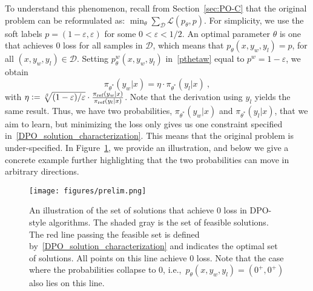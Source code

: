 To understand this phenomenon, recall from Section~\ref{sec:PO-C} that the original problem can be reformulated as: $\min_{\theta} \sum_{\mathcal{D}}{\mathcal L}(p_{\theta},p)$. 
For simplicity, we use the soft labels $p = (1 - \varepsilon , \varepsilon)$ for some $0 < \varepsilon < 1/2$. An optimal parameter $\theta$ is one that achieves $0$ loss for all samples in $\mathcal D$, which means that $p_{\theta}(x,y_w,y_l) = p$, for all $(x,y_w,y_l)\in\mathcal D$. Setting $p_{\theta}^w(x,y_w,y_l)$ in~\eqref{pthetaw} equal to $p^w=1-\varepsilon$, we obtain
%
\begin{equation} \label{DPO_solution_characterization}
    \pi_{\theta^{*}}(y_w | x) = \eta\cdot \pi_{\theta^{*}}(y_l | x)\ ,
\end{equation}
%
with $\eta \mathrel{\mathop:}= \sqrt[\beta]{(1 - \varepsilon)/\varepsilon}\cdot\frac{\pi_{\textrm{ref}}(y_w | x)}{\pi_{\textrm{ref}}(y_l | x)}$. Note that the derivation using $y_l$ yields the same result. Thus, we have two probabilities, $\pi_{\theta^{*}}(y_w | x)$ and $\pi_{\theta^{*}}(y_l | x)$, that we aim to learn, but minimizing the loss only gives us one constraint specified in~\eqref{DPO_solution_characterization}. This means that the original problem is under-specified. %
In Figure~\ref{fig:solution_set}, we provide an illustration, and below we give a concrete example further highlighting that the two probabilities can move in arbitrary directions.

\begin{figure}
    \centering
    \texttt{[image: figures/prelim.png]}
    \caption{An illustration of the set of solutions that achieve $0$ loss in DPO-style algorithms. The shaded gray is the set of feasible solutions. The red line passing the feasible set is defined by~\eqref{DPO_solution_characterization} and indicates the optimal set of solutions. All points on this line achieve $0$ loss. Note that the case where the probabilities collapse to 0, i.e.,~$p_{\theta}(x, y_w, y_l)=( 0^{+}, 0^{+} )$ also lies on this line.}
    \label{fig:solution_set}
\end{figure}

